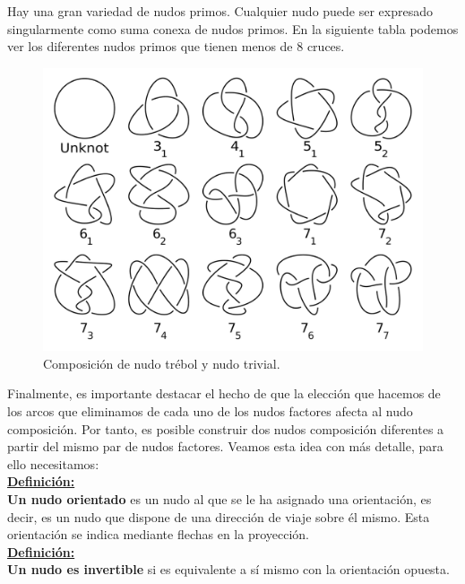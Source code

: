\documentclass[14pt]{extarticle}
\begin{document}
  Hay una gran variedad de nudos primos. Cualquier nudo puede ser expresado singularmente como suma conexa de nudos primos. En la siguiente tabla podemos ver los diferentes nudos primos que tienen menos de 8 cruces.\\
        \begin{figure}[h!]
        	\includegraphics[width=14cm]{tableknot.png}
        	\centering
        	\caption{Composición de nudo trébol y nudo trivial.}
        	\label{comp6} 
        \end{figure}
  
  
  
    
    Finalmente, es importante destacar el hecho de que la elección que hacemos de los arcos que eliminamos de cada uno de los nudos factores afecta al nudo composición. Por tanto, es posible construir dos nudos composición diferentes a partir del mismo par de nudos factores. Veamos esta idea con más detalle, para ello necesitamos:\\
    
   \underline{\textbf{ Definición:}}\\
   \textbf{ Un nudo orientado} es un nudo al que se le ha asignado una orientación, es decir, es un nudo que dispone de una dirección de viaje sobre él mismo. Esta orientación se indica mediante flechas en la proyección. \\
   
   \underline{\textbf{ Definición:}}\\
   \textbf{ Un nudo es invertible} si es equivalente a sí mismo con la orientación opuesta. \\
   
\end{document}
